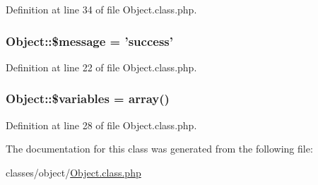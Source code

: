 Definition at line 34 of file Object.\-class.\-php.

\hypertarget{classObject_af661550c62873d6b6e61f32d68c56973}{
\subsubsection[{\$message}]{\setlength{\rightskip}{0pt plus 5cm}Object\-::\$message = 'success'}}\label{classObject_af661550c62873d6b6e61f32d68c56973}


Definition at line 22 of file Object.\-class.\-php.

\hypertarget{classObject_a153e76f6619408780cc2b50cef5100c6}{
\subsubsection[{\$variables}]{\setlength{\rightskip}{0pt plus 5cm}Object\-::\$variables = array()}}\label{classObject_a153e76f6619408780cc2b50cef5100c6}


Definition at line 28 of file Object.\-class.\-php.



The documentation for this class was generated from the following file\-:\begin{DoxyCompactItemize}
\item 
classes/object/\hyperlink{Object_8class_8php}{Object.\-class.\-php}\end{DoxyCompactItemize}
